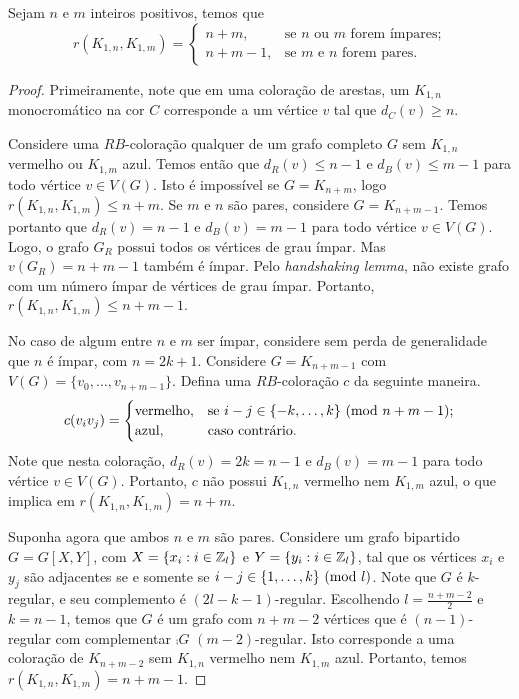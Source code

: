 \begin{theorem}
Sejam $n$ e $m$ inteiros positivos, temos que
\[r(K_{1,n}, K_{1,m}) = \begin{cases}
  n + m , & \text{se } n \text{ ou } m  \text{ forem ímpares;} \\
  n + m - 1, & \text{se } m \text{ e } n \text{ forem pares.}
\end{cases}\]
\end{theorem}
\begin{proof}
Primeiramente, note que em uma coloração de arestas, um $K_{1,n}$ monocromático na cor $C$ corresponde a um vértice $v$ tal que $d_C(v) \geq n$.

Considere uma $RB$-coloração qualquer de um grafo completo $G$ sem $K_{1,n}$ vermelho ou $K_{1,m}$ azul. Temos então que $d_R(v) \leq n-1$ e $d_B(v) \leq m-1$ para todo vértice $v \in V(G)$. Isto é impossível se $G = K_{n+m}$, logo $r(K_{1,n}, K_{1,m}) \leq n+m$.
Se $m$ e $n$ são pares, considere $G = K_{n+m-1}$. Temos portanto que $d_R(v) = n-1$ e $d_B(v) = m-1$ para todo vértice $v \in V(G)$. Logo, o grafo $G_R$ possui todos os vértices de grau ímpar. Mas $v(G_R) = n + m -1$ também é ímpar. Pelo \emph{handshaking lemma}, não existe grafo com um número ímpar de vértices de grau ímpar. Portanto, $r(K_{1,n}, K_{1,m}) \leq n + m - 1$.

No caso de algum entre $n$ e $m$ ser ímpar, considere sem perda de generalidade que $n$ é ímpar, com $n = 2k + 1$. Considere $G  = K_{n+m-1}$ com $V(G) = \{ v_0, \dots, v_{n+m-1} \}$. Defina uma $RB$-coloração $c$ da seguinte maneira.
\[c(v_i v_j) = \begin{cases}
  \text{vermelho}, & \text{se }  i - j \in \{ -k, \dots, k\} \ (\text{mod}\ n+m-1); \\
  \text{azul}, & \text{caso contrário}.
\end{cases}\]
Note que nesta coloração, $d_R(v) = 2k = n - 1$ e $d_B(v) = m - 1$ para todo vértice $v \in V(G)$. Portanto, $c$ não possui $K_{1,n}$ vermelho nem $K_{1,m}$ azul, o que implica em $r(K_{1,n}, K_{1,m}) = n + m$.

Suponha agora que ambos $n$ e $m$ são pares. Considere um grafo bipartido $G = G[X,Y]$, com $X = \{ x_i : i \in \mathbb{Z}_{l} \}$ e $Y = \{ y_i : i \in \mathbb{Z}_{l} \}$, tal que os vértices $x_i$ e $y_j$ são adjacentes se e somente se $i - j \in \{ 1, \dots, k\} \ (\text{mod}\ l)$. Note que $G$ é $k$-regular, e seu complemento é $(2l - k - 1)$-regular.
Escolhendo $l = \frac{n + m -2}{2}$ e $k = n-1$, temos que $G$ é um grafo com $n + m - 2$ vértices que é $(n-1)$-regular com complementar $\comp{G}$ $(m-2)$-regular. Isto corresponde a uma coloração de $K_{n + m - 2}$ sem $K_{1,n}$ vermelho nem $K_{1,m}$ azul. Portanto, temos $r(K_{1,n}, K_{1,m}) = n + m - 1$.
\end{proof}

